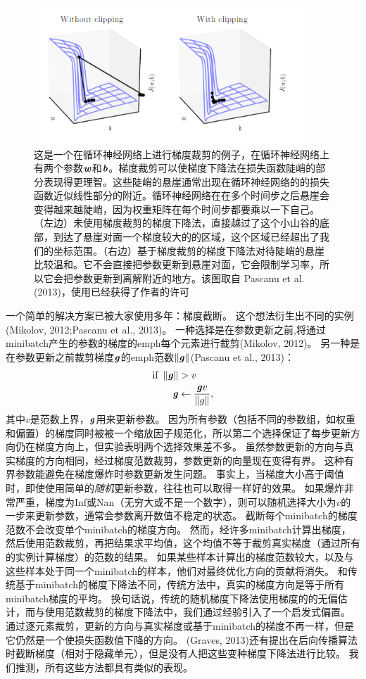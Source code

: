 \begin{figure}[htbp] %
   \centering
   \includegraphics[width=4in]{fig/chap10/10_17.PNG} 
   \caption{这是一个在循环神经网络上进行梯度裁剪的例子，在循环神经网络上有两个参数$\boldsymbol{\mathit{w}}$和$\boldsymbol{\mathit{b}}$。梯度裁剪可以使梯度下降法在损失函数陡峭的部分表现得更理智。这些陡峭的悬崖通常出现在循环神经网络的的损失函数近似线性部分的附近。循环神经网络在在多个时间步之后悬崖会变得越来越陡峭，因为权重矩阵在每个时间步都要乘以一下自己。（左边）未使用梯度裁剪的梯度下降法，直接越过了这个小山谷的底部，到达了悬崖对面一个梯度较大的的区域，这个区域已经超出了我们的坐标范围。（右边）基于梯度裁剪的梯度下降法对待陡峭的悬崖比较温和。它不会直接把参数更新到悬崖对面，它会限制学习率，所以它会把参数更新到离解附近的地方。该图取自 Pascanu et al. (2013)，使用已经获得了作者的许可}
   \label{fig:10_17}
\end{figure}


一个简单的解决方案已被大家使用多年：梯度截断。
这个想法衍生出不同的实例 (Mikolov, 2012;Pascanu et al., 2013)。
一种选择是在参数更新之前,将通过minibatch产生的参数的梯度的emph{每个元素}进行裁剪(Mikolov, 2012)。
另一种是在参数更新之前裁剪梯度$\boldsymbol{\mathit{g}}$的emph{范数}$\left\lVert \boldsymbol{\mathit{g}} \right\rVert$(Pascanu et al., 2013)：
\begin{align}
 \text{if}~ \left\lVert\boldsymbol{\mathit{g}}\right\rVert &> v \\
 \boldsymbol{\mathit{g}} &\gets \frac{\boldsymbol{\mathit{g}} v}{\left\lVert g\right\rVert},
\end{align}
其中$v$是范数上界，$\boldsymbol{\mathit{g}}$用来更新参数。
因为所有参数（包括不同的参数组，如权重和偏置）的梯度同时被被一个缩放因子规范化，所以第二个选择保证了每步更新方向仍在梯度方向上，但实验表明两个选择效果差不多。
虽然参数更新的方向与真实梯度的方向相同，经过梯度范数裁剪，参数更新的向量现在变得有界。
这种有界参数能避免在梯度爆炸时参数更新发生问题。
事实上，当梯度大小高于阈值时，即使使用简单的\emph{随机}更新参数，往往也可以取得一样好的效果。
如果爆炸非常严重，梯度为Inf或Nan（无穷大或不是一个数字），则可以随机选择大小为$v$的一步来更新参数，通常会参数离开数值不稳定的状态。
截断每个minibatch的梯度范数不会改变单个minibatch的梯度方向。
然而，经许多minibatch计算出梯度，然后使用范数裁剪，再把结果求平均值，这个均值不等于裁剪真实梯度（通过所有的实例计算梯度）的范数的结果。
如果某些样本计算出的梯度范数较大，以及与这些样本处于同一个minibatch的样本，他们对最终优化方向的贡献将消失。
和传统基于minibatch的梯度下降法不同，传统方法中，真实的梯度方向是等于所有minibatch梯度的平均。
换句话说，传统的随机梯度下降法使用梯度的的无偏估计，而与使用范数裁剪的梯度下降法中，我们通过经验引入了一个启发式偏置。
通过逐元素裁剪，更新的方向与真实梯度或基于minibatch的梯度不再一样，但是它仍然是一个使损失函数值下降的方向。
(Graves, 2013)还有提出在后向传播算法时截断梯度（相对于隐藏单元），但是没有人把这些变种梯度下降法进行比较。 我们推测，所有这些方法都具有类似的表现。


